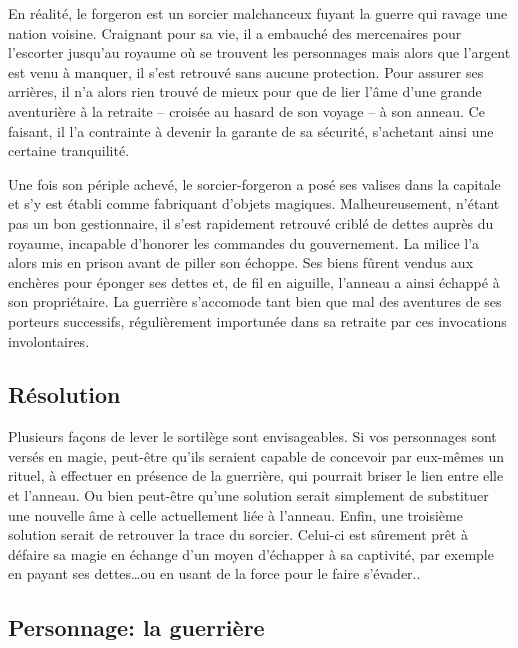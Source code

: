 \documentclass[a5paper,pagesize,10pt,bibliography=totoc,numbers=enddot,
headings=normal,DIV=9,twoside=false,tablecaptionabove]{scrbook}
\begin{document}
En réalité, le forgeron est un sorcier malchanceux fuyant la guerre qui ravage une nation voisine.
Craignant pour sa vie, il a embauché des mercenaires pour l'escorter jusqu'au royaume où se trouvent les personnages mais alors que l'argent est venu à manquer, il s'est retrouvé sans aucune protection.
Pour assurer ses arrières, il n'a alors rien trouvé de mieux pour que de lier l'âme d'une grande aventurière à la retraite -- croisée au hasard de son voyage -- à son anneau.
Ce faisant, il l'a contrainte à devenir la garante de sa sécurité, s'achetant ainsi une certaine tranquilité.

Une fois son périple achevé, le sorcier-forgeron a posé ses valises dans la capitale et s'y est établi comme fabriquant d'objets magiques.
Malheureusement, n'étant pas un bon gestionnaire, il s'est rapidement retrouvé criblé de dettes auprès du royaume, incapable d'honorer les commandes du gouvernement.
La milice l'a alors mis en prison avant de piller son échoppe.
Ses biens fûrent vendus aux enchères pour éponger ses dettes et, de fil en aiguille, l'anneau a ainsi échappé à son propriétaire.
La guerrière s'accomode tant bien que mal des aventures de ses porteurs successifs, régulièrement importunée dans sa retraite par ces invocations involontaires.

\subsection*{Résolution}

Plusieurs façons de lever le sortilège sont envisageables.
Si vos personnages sont versés en magie, peut-être qu'ils seraient capable de concevoir par eux-mêmes un rituel, à effectuer en présence de la guerrière, qui pourrait briser le lien entre elle et l'anneau.
Ou bien peut-être qu'une solution serait simplement de substituer une nouvelle âme à celle actuellement liée à l'anneau.
Enfin, une troisième solution serait de retrouver la trace du sorcier.
Celui-ci est sûrement prêt à défaire sa magie en échange d'un moyen d'échapper à sa captivité, par exemple en payant ses dettes\dots ou en usant de la force pour le faire s'évader..

\subsection*{Personnage: la guerrière}

\newcommand\descriptionperso[5]{%
	\begin{minipage}{0.7\textwidth}
	\textbf{Caractère}: #1

	\textbf{Force}: #2

	\textbf{Faiblesse}: #3

	\textbf{Objectif}: #4

	#5
	\end{minipage}
}%
\end{document}

